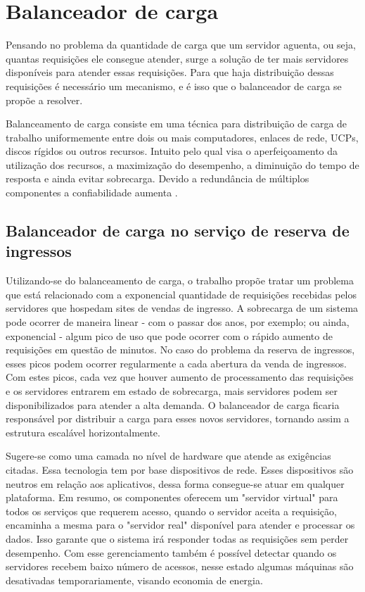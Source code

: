 \chapter{Balanceador de carga}\label{balanceador-de-carga}

Pensando no problema da quantidade de carga que um servidor aguenta, ou seja, quantas requisições ele consegue atender,
surge a solução de ter mais servidores disponíveis para atender essas requisições.
Para que haja distribuição dessas requisições é necessário um mecanismo, e é isso que o balanceador de carga se
propõe a resolver.

\begin{citacao}
Balanceamento de carga consiste em uma técnica para distribuição de carga de trabalho uniformemente entre dois ou mais
computadores, enlaces de rede, UCPs, discos rígidos ou outros recursos. Intuito pelo qual visa o aperfeiçoamento da
utilização dos recursos, a maximização do desempenho, a diminuição do tempo de resposta e ainda evitar sobrecarga.
Devido a redundância de múltiplos componentes a confiabilidade
aumenta \cite{o-que-e-e-para-que-serve-o-balanceamento-de-carga}.
\end{citacao}


\section{Balanceador de carga no serviço de reserva de ingressos}

Utilizando-se do balanceamento de carga, o trabalho propõe tratar um problema que está relacionado com a exponencial
quantidade de requisições recebidas pelos servidores que hospedam sites de vendas de ingresso. A sobrecarga de um
sistema pode ocorrer de maneira linear - com o passar dos anos, por exemplo; ou ainda, exponencial - algum pico de uso
que pode ocorrer com o rápido aumento de requisições em questão de minutos.
No caso do problema da reserva de ingressos, esses picos podem ocorrer regularmente a cada abertura da venda de ingressos.
Com estes picos, cada vez que houver aumento de processamento das requisições e os servidores entrarem em
estado de sobrecarga, mais servidores podem ser disponibilizados para atender a alta demanda.
O balanceador de carga ficaria responsável por distribuir a carga para esses novos servidores,
tornando assim a estrutura escalável horizontalmente.

Sugere-se como uma camada no nível de hardware que atende as exigências citadas.
Essa tecnologia tem por base dispositivos de rede. Esses dispositivos são neutros em relação aos aplicativos, dessa forma
consegue-se atuar em qualquer plataforma. Em resumo, os componentes oferecem um "servidor virtual" para todos os serviços
que requerem acesso, quando o servidor aceita a requisição, encaminha a mesma para o "servidor real" disponível para atender
e processar os dados.
Isso garante que o sistema irá responder todas as requisições sem perder desempenho.
Com esse gerenciamento também é possível detectar quando os servidores recebem baixo número de acessos, nesse
estado algumas máquinas são desativadas temporariamente, visando economia de energia.

